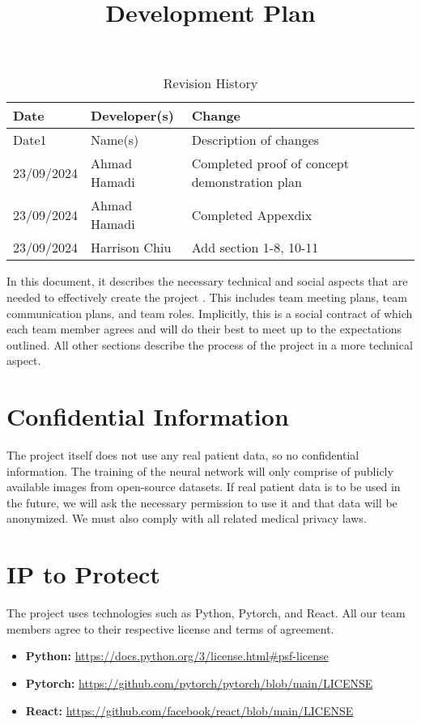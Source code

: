 \documentclass{article}
\title{Development Plan\\\progname}
\author{\authname}
\date{}
\begin{document}
\maketitle

\begin{table}[hp]
\caption{Revision History} \label{TblRevisionHistory}
\begin{tabularx}{\textwidth}{llX}
\toprule
\textbf{Date} & \textbf{Developer(s)} & \textbf{Change}\\
\midrule
Date1 & Name(s) & Description of changes\\
23/09/2024 & Ahmad Hamadi & Completed proof of concept demonstration plan\\
23/09/2024 & Ahmad Hamadi & Completed Appexdix\\
23/09/2024 & Harrison Chiu & Add section 1-8, 10-11\\
\bottomrule
\end{tabularx}
\end{table}

\newpage{}

\tableofcontents
\newpage{}

In this document, it describes the necessary technical and social aspects that are needed to 
effectively create the project \progname. This includes team meeting plans, team communication
plans, and team roles. Implicitly, this is a social contract of which each team member agrees
and will do their best to meet up to the expectations outlined.
All other sections describe the process of the project in a more technical aspect.


\section{Confidential Information}

The project itself does not use any real patient data, so no confidential information.
The training of the neural network will only comprise of publicly available images from 
open-source datasets. If real patient data is to be used in the future, we will ask the necessary 
permission to use it and that data will be anonymized. We must also comply with all related 
medical privacy laws.

\section{IP to Protect}

The project uses technologies such as Python, Pytorch, and React. All our team members agree
to their respective license and terms of agreement.
\begin{itemize}
\item \textbf{Python:} \url{https://docs.python.org/3/license.html#psf-license}
\item \textbf{Pytorch:} \url{https://github.com/pytorch/pytorch/blob/main/LICENSE}
\item \textbf{React:} \url{https://github.com/facebook/react/blob/main/LICENSE}
\end{itemize}
\end{document}
